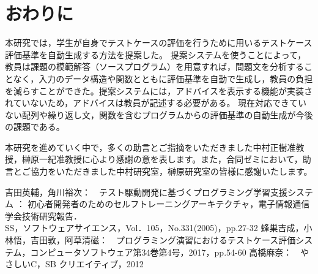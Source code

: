\documentclass{tpu-sotu}
\begin{document}
\chapter{おわりに}
本研究では，学生が自身でテストケースの評価を行うために用いるテストケース評価基準を自動生成する方法を提案した。
提案システムを使うことによって，教員は課題の模範解答（ソースプログラム）を用意すれば，問題文を分析することなく，入力のデータ構造や関数とともに評価基準を自動で生成し，教員の負担を減らすことができた。提案システムには，アドバイスを表示する機能が実装されていないため，アドバイスは教員が記述する必要がある。
現在対応できていない配列や繰り返し文，関数を含むプログラムからの評価基準の自動生成が今後の課題である。

\acknowledgements
本研究を進めていく中で，多くの助言とご指摘をいただきました中村正樹准教授，榊原一紀准教授に心より感謝の意を表します。また，合同ゼミにおいて，助言とご協力をいただきました中村研究室，榊原研究室の皆様に感謝いたします。
\begin{thebibliography}{3}
    吉田英輔，角川裕次：　テスト駆動開発に基づくプログラミング学習支援システム ： 初心者開発者のためのセルフトレーニングアーキテクチャ，電子情報通信学会技術研究報告．\\SS，ソフトウェアサイエンス，Vol．105，No.331(2005)，pp.27-32
    蜂巣吉成，小林悟，吉田敦，阿草清磁：　プログラミング演習におけるテストケース評価システム，コンピュータソフトウェア第34巻第4号，2017，pp.54-60
    高橋麻奈：　やさしいC，SB クリエイティブ，2012
\end{thebibliography}
\end{document}
